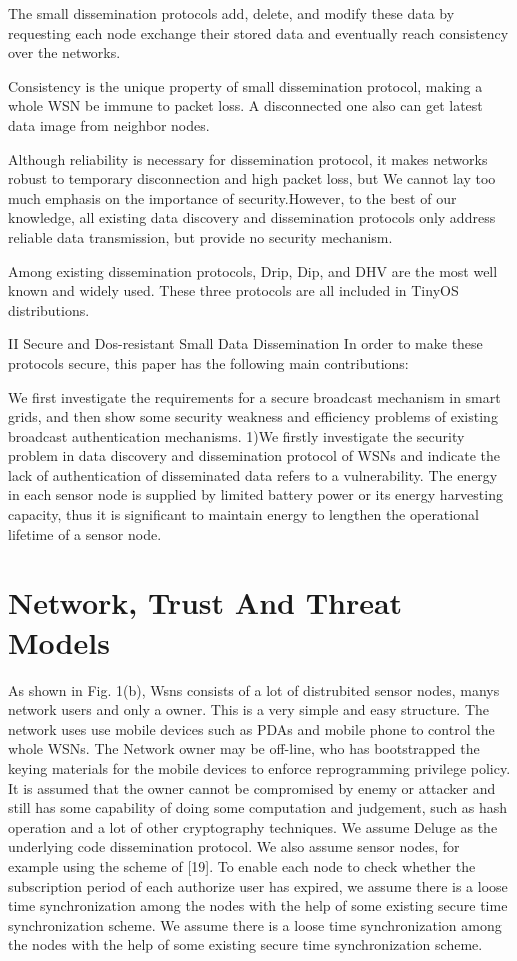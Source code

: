 \documentclass[lnicst,sechang,a4paper]{svmultln}
\begin{document}
The small dissemination protocols add, delete, and modify these data by requesting each node exchange their stored data and eventually reach consistency over the networks.

Consistency is the unique property of small dissemination protocol, making a whole WSN be immune to packet loss. A disconnected one also can get latest data image from neighbor nodes.

Although reliability is necessary for dissemination protocol, it makes networks robust to temporary disconnection and high packet loss, but We cannot lay too much emphasis on the importance of security.However, to the best of our knowledge, all existing data discovery and dissemination protocols only address reliable data transmission, but provide no security mechanism.

Among existing dissemination protocols, Drip, Dip, and DHV are the most well known and widely used. These three protocols are all included in TinyOS distributions.

II Secure and Dos-resistant Small Data Dissemination
In order to make these protocols secure, this paper has the following main contributions:

We first investigate the requirements for a secure broadcast mechanism in smart grids, and then show some security weakness and efficiency problems of existing broadcast authentication mechanisms.
1)We firstly investigate the security problem in data discovery and dissemination protocol of WSNs and indicate the lack of authentication of disseminated data refers to a vulnerability. The energy in each sensor node is supplied by limited battery power or its energy harvesting capacity, thus it is significant to maintain energy to lengthen the operational lifetime of a sensor node.

\section{Network, Trust And Threat Models}
As shown in Fig. 1(b), Wsns consists of a lot of distrubited sensor nodes, manys network users and only a owner. This is a very simple and easy structure. The network uses use mobile devices such as PDAs and mobile phone to control the whole WSNs. The Network owner may be off-line, who has bootstrapped the keying materials for the mobile devices to enforce reprogramming privilege policy. It is assumed that the owner cannot be compromised by enemy or attacker and still has some capability of doing some computation and judgement, such as hash operation and  a lot of other cryptography techniques. We assume Deluge as the underlying code dissemination protocol. We also assume sensor nodes, for example using the scheme of [19]. To enable each node to check whether the subscription period of each authorize user has expired, we assume there is a loose time synchronization among the nodes with the help of some existing secure time synchronization scheme.
We assume there is a loose time synchronization among the nodes with the help of some existing secure time synchronization scheme.
\end{document}
